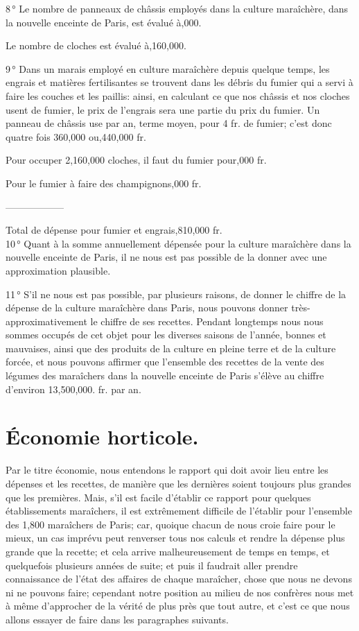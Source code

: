 \documentclass[10pt,a4paper]{book}
\begin{document}
8\,° Le nombre de panneaux de châssis employés dans la culture maraîchère, dans la nouvelle enceinte de Paris, est évalué à,000.

Le nombre de cloches est évalué à,160,000.

9\,° Dans un marais employé en culture maraîchère depuis quelque temps, les engrais et matières fertilisantes se trouvent dans les débris du fumier qui a servi à faire les couches et les paillis: ainsi, en calculant ce que nos châssis et nos cloches usent de fumier, le prix de l'engrais sera une partie du prix du fumier. Un panneau de châssis use par an, terme moyen, pour 4 fr. de fumier; c'est donc quatre fois 360,000 ou,440,000 fr.

Pour occuper 2,160,000 cloches, il faut du fumier pour,000 fr.

Pour le fumier à faire des champignons,000 fr.

\hfill ------------------

Total de dépense pour fumier et engrais,810,000 fr.\\

10\,° Quant à la somme annuellement dépensée pour la culture maraîchère dans la nouvelle enceinte de Paris, il ne nous est pas possible de la donner avec une approximation plausible.

11\,° S'il ne nous est pas possible, par plusieurs raisons, de donner le chiffre de la dépense de la culture maraîchère dans Paris, nous pouvons donner très-approximativement le chiffre de ses recettes. Pendant longtemps nous nous sommes occupés de cet objet pour les diverses saisons de l'année, bonnes et mauvaises, ainsi que des produits de la culture en pleine terre et de la culture forcée, et nous pouvons affirmer que l'ensemble des recettes de la vente des légumes des maraîchers dans la nouvelle enceinte de Paris s'élève au chiffre d'environ 13,500,000. fr. par an.

\section{Économie horticole.}

Par le titre économie, nous entendons le rapport qui doit avoir lieu entre les dépenses et les recettes, de manière que les dernières soient toujours plus grandes que les premières. Mais, s'il est facile d'établir ce rapport pour quelques établissements maraîchers, il est extrêmement difficile de l'établir pour l'ensemble des 1,800 maraîchers de Paris; car, quoique chacun de nous croie faire pour le mieux, un cas imprévu peut renverser tous nos calculs et rendre la dépense plus grande que la recette; et cela arrive malheureusement de temps en temps, et quelquefois plusieurs années de suite; et puis il faudrait aller prendre connaissance de l'état des affaires de chaque maraîcher, chose que nous ne devons ni ne pouvons faire; cependant notre position au milieu de nos confrères nous met à même d'approcher de la vérité de plus près que tout autre, et c'est ce que nous allons essayer de faire dans les paragraphes suivants.
\end{document}

